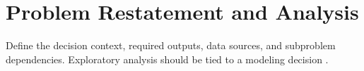 \section{Problem Restatement and Analysis}

Define the decision context, required outputs, data sources, and subproblem
dependencies. Exploratory analysis should be tied to a modeling decision
\cite{tukey1977exploratory}.
